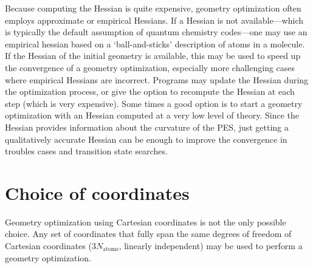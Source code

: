 \documentclass[../Main/chem371-notes.tex]{subfiles}
\begin{document}
Because computing the Hessian is quite expensive, geometry optimization often employs approximate or empirical Hessians.
If a Hessian is not available---which is typically the default assumption of quantum chemistry codes---one may use an empirical hessian based on a `ball-and-sticks' description of atoms in a molecule.
If the Hessian of the initial geometry is available, this may be used to speed up the convergence of a geometry optimization, especially more challenging cases where empirical Hessians are incorrect.
Programs may update the Hessian during the optimization process, or give the option to recompute the Hessian at each step (which is very expensive).
Some times a good option is to start a geometry optimization with an Hessian computed at a very low level of theory.
Since the Hessian provides information about the curvature of the PES, just getting a qualitatively accurate Hessian can be enough to improve the convergence in troubles cases and transition state searches.

\section{Choice of coordinates}


Geometry optimization using Cartesian coordinates is not the only possible choice.
Any set of coordinates that fully span the same degrees of freedom of Cartesian coordinates (3$N_\mathrm{atoms}$, linearly independent) may be used to perform a geometry optimization.
\end{document}
